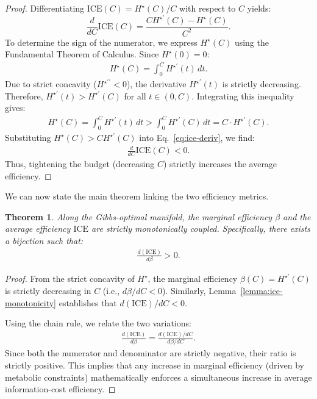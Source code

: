 \documentclass[11pt]{article}
\newtheorem{theorem}{Theorem}[section]
\theoremstyle{remark}
\theoremstyle{definition}
\begin{document}
\begin{proof}
Differentiating \(\mathrm{ICE}(C) = H^\star(C)/C\) with respect to \(C\) yields:
\begin{equation}
    \frac{d}{dC}\mathrm{ICE}(C) = \frac{C H^{\star\prime}(C) - H^\star(C)}{C^2}.
    \label{eq:ice-deriv}
\end{equation}
To determine the sign of the numerator, we express \(H^\star(C)\) using the Fundamental Theorem of Calculus. Since \(H^\star(0)=0\):
\begin{align}
    H^\star(C) = \int_{0}^{C} H^{\star\prime}(t) \, dt.
\end{align}
Due to strict concavity (\(H^{\star\prime\prime} < 0\)), the derivative \(H^{\star\prime}(t)\) is strictly decreasing. Therefore, \(H^{\star\prime}(t) > H^{\star\prime}(C)\) for all \(t \in (0, C)\). Integrating this inequality gives:
\begin{align}
    H^\star(C) = \int_{0}^{C} H^{\star\prime}(t) \, dt > \int_{0}^{C} H^{\star\prime}(C) \, dt = C \cdot H^{\star\prime}(C).
\end{align}
Substituting \(H^\star(C) > C H^{\star\prime}(C)\) into Eq.~\eqref{eq:ice-deriv}, we find:
\begin{align}
    \frac{d}{dC}\mathrm{ICE}(C) < 0.
\end{align}
Thus, tightening the budget (decreasing \(C\)) strictly increases the average efficiency.
\end{proof}

We can now state the main theorem linking the two efficiency metrics.

\begin{theorem}
\label{thm:beta-ICE-coupling}
Along the Gibbs-optimal manifold, the marginal efficiency \(\beta\) and the average efficiency \(\mathrm{ICE}\) are strictly monotonically coupled. Specifically, there exists a bijection such that:
\begin{align}
    \frac{d(\mathrm{ICE})}{d\beta} > 0.
\end{align}
\end{theorem}

\begin{proof}
From the strict concavity of \(H^\star\), the marginal efficiency \(\beta(C) = H^{\star\prime}(C)\) is strictly decreasing in \(C\) (i.e., \(d\beta/dC < 0\)). Similarly, Lemma~\ref{lemma:ice-monotonicity} establishes that \(d(\mathrm{ICE})/dC < 0\). 

Using the chain rule, we relate the two variations:
\begin{align}
    \frac{d(\mathrm{ICE})}{d\beta} = \frac{d(\mathrm{ICE})/dC}{d\beta/dC}.
\end{align}
Since both the numerator and denominator are strictly negative, their ratio is strictly positive. This implies that any increase in marginal efficiency (driven by metabolic constraints) mathematically enforces a simultaneous increase in average information-cost efficiency.
\end{proof}
\end{document}
